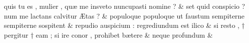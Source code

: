 \documentclass[12pt,onecolumn,twoside,a4paper]{memoir}
\begin{document}
\begin{pairs}
\begin{Leftside}
                              quis
                              tu
                              es
                              ,
                              mulier
                              ,
                              quæ
                              me
                              insveto
                              nuncupasti
                              nomine
                              ? \&
                         \stanza {}
                     set
                              quid
                              conspicio
                              ?
                              num
                              me
                              lactans
                              calvitur
                              Ætas
                              ? \&
                         \stanza {}
                     populoque
                              {populoque}
                              ut
                              faustum
                              sempiterne
                              {sempiterne}
                              sospitent \&
                         \stanza {}
                     repudio
                              auspicium
                              :
                              regrediundum
                              est
                              ilico \&
                         \stanza {}
                     si
                              resto
                              ,
                              †
                              pergitur
                              †
                              eam
                              ;
                              si
                              ire
                              conor
                              ,
                              prohibet
                              bætere \&
                         \stanza {}
                     neque
                              profundum \&
                     
                  \endnumbering
		\end{Leftside}
                  \begin{Rightside}
			\beginnumbering
			\numberstanzafalse
                     

\end{Rightside}
\end{pairs}
\end{document}
